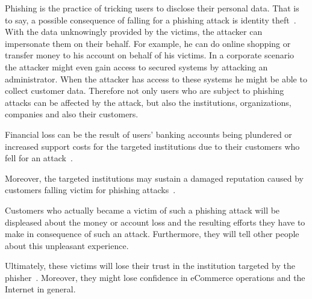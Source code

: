 \begin{description}[leftmargin=0cm]
	\item[Identity and Data Theft] Phishing is the practice of tricking users to disclose their personal data.
 That is to say, a possible consequence of falling for a phishing attack is identity theft~\cite{jakobsson2006phishing}.
 With the data unknowingly provided by the victims, the attacker can impersonate them on their behalf.
 For example, he can do online shopping or transfer money to his account on behalf of his victims.
 In a corporate scenario the attacker might even gain access to secured systems by attacking an administrator.
 When the attacker has access to these systems he might be able to collect customer data.
 Therefore not only users who are subject to phishing attacks can be affected by the attack, but also the institutions, organizations, companies and also their customers.
	\item[Financial Loss] Financial loss can be the result of users' banking accounts being plundered or increased support costs for the targeted institutions due to their customers who fell for an attack~\cite{rsa2013, mcafee}.
	\item[Reputational Damage] Moreover, the targeted institutions may sustain a damaged reputation caused by customers falling victim for phishing attacks~\cite{mcafee, redcondor}.
	\item[Displeased Customers] Customers who actually became a victim of such a phishing attack will be displeased about the money or account loss and the resulting efforts they have to make in consequence of such an attack.
 Furthermore, they will tell other people about this unpleasant experience.
	\item[Loss of Trust] Ultimately, these victims will lose their trust in the institution targeted by the phisher~\cite{redcondor}.
 Moreover, they might lose confidence in eCommerce operations and the Internet in general.
\end{description}
 

